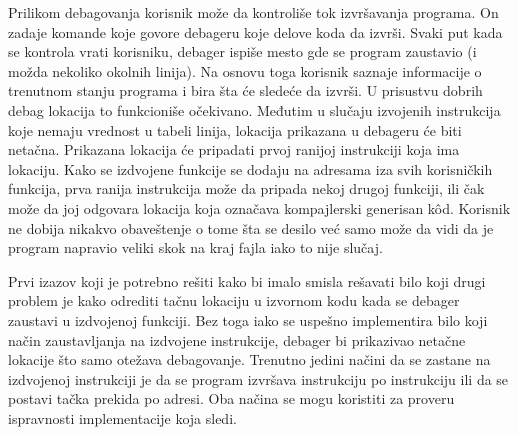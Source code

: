 \documentclass[12pt,oneside]{memoir}
\begin{document}
\label{sec:debugger_line_number}

Prilikom debagovanja korisnik može da kontroliše tok izvršavanja programa.
On zadaje komande koje govore debageru koje delove koda da izvrši.
Svaki put kada se kontrola vrati korisniku, debager ispiše mesto gde se program zaustavio (i možda nekoliko okolnih linija).
Na osnovu toga korisnik saznaje informacije o trenutnom stanju programa i bira šta će sledeće da izvrši.
U prisustvu dobrih debag lokacija to funkcioniše očekivano.
Međutim u slučaju izvojenih instrukcija koje nemaju vrednost u tabeli linija, lokacija prikazana u debageru će biti netačna.
Prikazana lokacija će pripadati prvoj ranijoj instrukciji koja ima lokaciju.
Kako se izdvojene funkcije se dodaju na adresama iza svih korisničkih funkcija, prva ranija instrukcija može da pripada nekoj drugoj funkciji, ili čak može da joj odgovara lokacija koja označava kompajlerski generisan k\^od.
Korisnik ne dobija nikakvo obaveštenje o tome šta se desilo već samo može da vidi da je program napravio veliki skok na kraj fajla iako to nije slučaj.


Prvi izazov koji je potrebno rešiti kako bi imalo smisla rešavati bilo koji drugi problem je kako odrediti tačnu lokaciju u izvornom kodu kada se debager zaustavi u izdvojenoj funkciji.
Bez toga iako se uspešno implementira bilo koji način zaustavljanja na izdvojene instrukcije, debager bi prikazivao netačne lokacije što samo otežava debagovanje.
Trenutno jedini načini da se zastane na izdvojenoj instrukciji je da se program izvršava instrukciju po instrukciju ili da se postavi tačka prekida po adresi.
Oba načina se mogu koristiti za proveru ispravnosti implementacije koja sledi.
\end{document}
